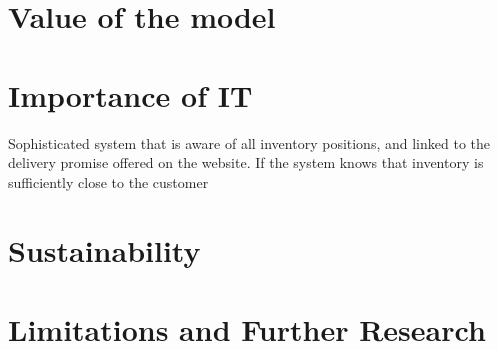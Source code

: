 \documentclass[../../main.tex]{subfiles}
\begin{document}
\section{Value of the model}

\section{Importance of IT}
Sophisticated system that is aware of all inventory positions, and linked to the delivery promise offered on the website. If the system knows that inventory is sufficiently close to the customer

\section{Sustainability}

\section{Limitations and Further Research}

\end{document}
